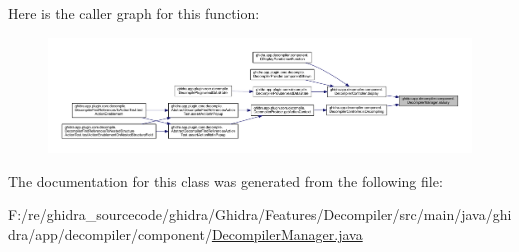 Here is the caller graph for this function\+:
\nopagebreak
\begin{figure}[H]
\begin{center}
\leavevmode
\includegraphics[width=350pt]{classghidra_1_1app_1_1decompiler_1_1component_1_1_decompiler_manager_a09fc0d005fa5d29e5a348cefbeb0e0ef_icgraph}
\end{center}
\end{figure}


The documentation for this class was generated from the following file\+:\begin{DoxyCompactItemize}
\item 
F\+:/re/ghidra\+\_\+sourcecode/ghidra/\+Ghidra/\+Features/\+Decompiler/src/main/java/ghidra/app/decompiler/component/\mbox{\hyperlink{_decompiler_manager_8java}{Decompiler\+Manager.\+java}}\end{DoxyCompactItemize}
